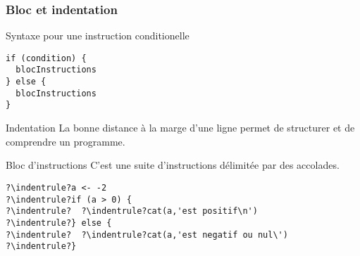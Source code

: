 \documentclass[10pt]{beamer}
\begin{document}
\begin{frame}[fragile]
  \frametitle{Bloc et indentation}
  \begin{alertblock}{Syntaxe pour une instruction conditionelle}
    \begin{lstlisting}[style=edblock]
if (condition) { 
  blocInstructions
} else { 
  blocInstructions
}
\end{lstlisting}
\end{alertblock}

\begin{block}{Indentation}
  La bonne distance à la marge d'une ligne permet de structurer et de comprendre un programme.
\end{block}
  
\begin{block}{Bloc d'instructions}
  C'est une suite d'instructions délimitée par des accolades.
\end{block}
  
  \newcommand{\indentrule}{\color{BrickRed}\vrule width 1pt\hspace{2pt}}        
  \begin{lstlisting}[style=editor, escapechar=?]
?\indentrule?a <- -2
?\indentrule?if (a > 0) {
?\indentrule?  ?\indentrule?cat(a,'est positif\n')
?\indentrule?} else {
?\indentrule?  ?\indentrule?cat(a,'est negatif ou nul\')
?\indentrule?}    
\end{lstlisting}

\end{frame}
\end{document}
